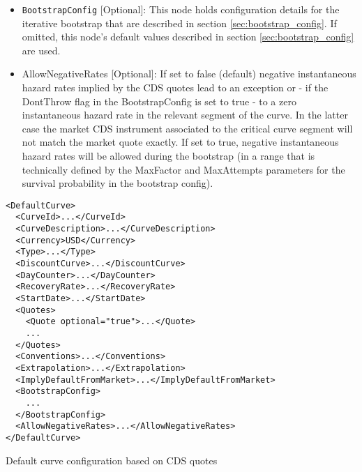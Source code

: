\begin{itemize}
\item \lstinline!BootstrapConfig! [Optional]:
This node holds configuration details for the iterative bootstrap that are described in section \ref{sec:bootstrap_config}. If omitted, this node's default values described in section \ref{sec:bootstrap_config} are used.

\item AllowNegativeRates [Optional]: If set to false (default) negative instantaneous hazard rates implied by the CDS
  quotes lead to an exception or - if the DontThrow flag in the BootstrapConfig is set to true - to a zero instantaneous
  hazard rate in the relevant segment of the curve. In the latter case the market CDS instrument associated to the
  critical curve segment will not match the market quote exactly. If set to true, negative instantaneous hazard rates
  will be allowed during the bootstrap (in a range that is technically defined by the MaxFactor and MaxAttempts
  parameters for the survival probability in the bootstrap config).

\end{itemize}

\begin{longlisting}
\begin{verbatim}
<DefaultCurve>
  <CurveId>...</CurveId>
  <CurveDescription>...</CurveDescription>
  <Currency>USD</Currency> 
  <Type>...</Type>
  <DiscountCurve>...</DiscountCurve>
  <DayCounter>...</DayCounter>
  <RecoveryRate>...</RecoveryRate>
  <StartDate>...</StartDate>
  <Quotes>
    <Quote optional="true">...</Quote>
    ...
  </Quotes>
  <Conventions>...</Conventions>
  <Extrapolation>...</Extrapolation>
  <ImplyDefaultFromMarket>...</ImplyDefaultFromMarket>
  <BootstrapConfig>
    ...
  </BootstrapConfig>
  <AllowNegativeRates>...</AllowNegativeRates>
</DefaultCurve>
\end{verbatim}
\caption{Default curve configuration based on CDS quotes}
\label{lst:defaultcurve_cds_configuration}
\end{longlisting}

